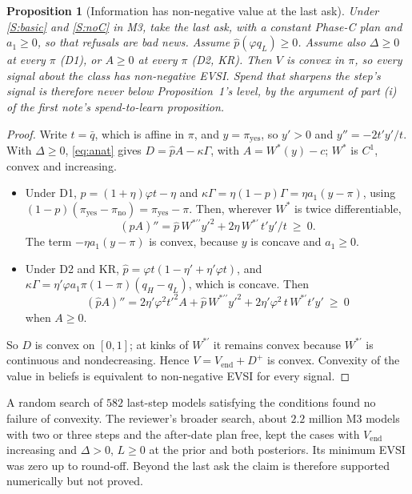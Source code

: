 \documentclass[11pt,a4paper]{article}
\newtheorem{proposition}[theorem]{Proposition}
\theoremstyle{definition}
\theoremstyle{remark}
\newcommand{\Vend}{V_{\mathrm{end}}}
\newcommand{\pp}{\hat p}
\newcommand{\py}{\pi_{\mathrm{yes}}}
\newcommand{\pn}{\pi_{\mathrm{no}}}
\newcommand{\qb}{\bar q}
\begin{document}
\begin{proposition}[Information has non-negative value at the last ask]\label{prop:voi}
Under \ref{S:basic} and \ref{S:noC} in M3, take the last ask, with a constant Phase-C plan and $a_1\ge0$, so that refusals are bad news. Assume $\pp(\varphi q_L)\ge0$. Assume also $\Delta\ge0$ at every $\pi$ (D1), or $A\ge0$ at every $\pi$ (D2, KR). Then $V$ is convex in $\pi$, so every signal about the class has non-negative EVSI. Spend that sharpens the step's signal is therefore never below Proposition~1's level, by the argument of part (i) of the first note's spend-to-learn proposition.
\end{proposition}

\begin{proof}
Write $t=\qb$, which is affine in $\pi$, and $y=\py$, so $y'>0$ and $y''=-2t'y'/t$. With $\Delta\ge0$, \eqref{eq:anat} gives $D=\pp A-\kappa\Gamma$, with $A=W^*(y)-c$; $W^*$ is $C^1$, convex and increasing.
\begin{itemize}
\item Under D1, $\pp=(1+\eta)\varphi t-\eta$ and $\kappa\Gamma=\eta(1-p)\Gamma=\eta a_1(y-\pi)$, using $(1-p)(\py-\pn)=\py-\pi$. Then, wherever $W^*$ is twice differentiable,
\[
(\pp A)''=\pp\,W^{*\prime\prime}y'^2+2\eta\,W^{*\prime}\,t'y'/t\ \ge\ 0 .
\]
The term $-\eta a_1(y-\pi)$ is convex, because $y$ is concave and $a_1\ge0$.
\item Under D2 and KR, $\pp=\varphi t(1-\eta'+\eta'\varphi t)$, and $\kappa\Gamma=\eta'\varphi a_1\pi(1-\pi)(q_H-q_L)$, which is concave. Then
\[
(\pp A)''=2\eta'\varphi^2t'^2A+\pp\,W^{*\prime\prime}y'^2+2\eta'\varphi^2\,t\,W^{*\prime}t'y'\ \ge\ 0
\]
when $A\ge0$.
\end{itemize}
So $D$ is convex on $[0,1]$; at kinks of $W^{*\prime}$ it remains convex because $W^{*\prime}$ is continuous and nondecreasing. Hence $V=\Vend+D^+$ is convex. Convexity of the value in beliefs is equivalent to non-negative EVSI for every signal.
\end{proof}

A random search of $582$ last-step models satisfying the conditions found no failure of convexity. The reviewer's broader search, about $2.2$ million M3 models with two or three steps and the after-date plan free, kept the cases with $\Vend$ increasing and $\Delta>0$, $L\ge0$ at the prior and both posteriors. Its minimum EVSI was zero up to round-off. Beyond the last ask the claim is therefore supported numerically but not proved.
\end{document}
